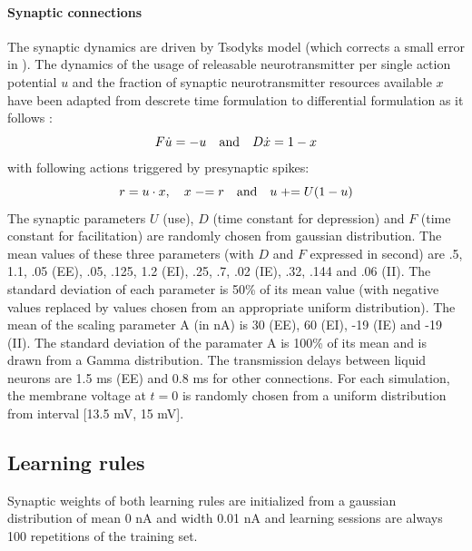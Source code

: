 \documentclass[11pt, a4paper]{article} %
\begin{document}
\paragraph{Synaptic connections} The synaptic dynamics are driven by Tsodyks model \cite{maass2002synapses} (which corrects a small error in \cite{markram1998differential}). The dynamics of the usage of releasable neurotransmitter per single action potential $u$ and the fraction of synaptic neurotransmitter resources available $x$ have been adapted from descrete time formulation to differential formulation as it follows : \begin{equation}
F \dot{u} = -u \quad \textnormal{and} \quad D \dot{x} = 1-x
\end{equation}
with following actions triggered by presynaptic spikes: \begin{equation}
r = u \cdot x, \quad x \mathrel{-}= r \quad \textnormal{and} \quad u \mathrel{+}= U(1-u)
\end{equation}
The synaptic parameters $U$ (use), $D$ (time constant for depression) and $F$ (time constant for facilitation) are randomly chosen from gaussian distribution. The mean values of these three parameters (with $D$ and $F$ expressed in second) are .5, 1.1, .05 (EE), .05, .125, 1.2 (EI), .25, .7, .02 (IE), .32, .144 and .06 (II). The standard deviation of each parameter is 50\% of its mean value (with negative values replaced by values chosen from an appropriate uniform distribution). The mean of the scaling parameter A (in nA) is 30 (EE), 60 (EI), -19 (IE) and -19 (II). The standard deviation of the paramater A is 100\% of its mean and is drawn from a Gamma distribution. The transmission delays between liquid neurons are 1.5 ms (EE) and 0.8 ms for other connections. For each simulation, the membrane voltage at $t=0$ is randomly chosen from a uniform distribution from interval [13.5 mV, 15 mV].

\subsection{Learning rules}
Synaptic weights of both learning rules are initialized from a gaussian distribution of mean 0 nA and width 0.01 nA and learning sessions are always 100 repetitions of the training set.
\end{document}
